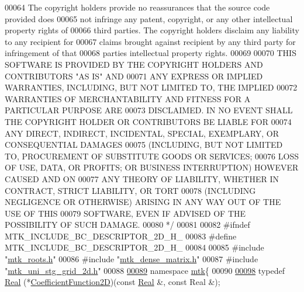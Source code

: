 \begin{DoxyCode}
00064 \textcolor{comment}{The copyright holders provide no reassurances that the source code provided does}
00065 \textcolor{comment}{not infringe any patent, copyright, or any other intellectual property rights of}
00066 \textcolor{comment}{third parties. The copyright holders disclaim any liability to any recipient for}
00067 \textcolor{comment}{claims brought against recipient by any third party for infringement of that}
00068 \textcolor{comment}{parties intellectual property rights.}
00069 \textcolor{comment}{}
00070 \textcolor{comment}{THIS SOFTWARE IS PROVIDED BY THE COPYRIGHT HOLDERS AND CONTRIBUTORS "AS IS" AND}
00071 \textcolor{comment}{ANY EXPRESS OR IMPLIED WARRANTIES, INCLUDING, BUT NOT LIMITED TO, THE IMPLIED}
00072 \textcolor{comment}{WARRANTIES OF MERCHANTABILITY AND FITNESS FOR A PARTICULAR PURPOSE ARE}
00073 \textcolor{comment}{DISCLAIMED. IN NO EVENT SHALL THE COPYRIGHT HOLDER OR CONTRIBUTORS BE LIABLE FOR}
00074 \textcolor{comment}{ANY DIRECT, INDIRECT, INCIDENTAL, SPECIAL, EXEMPLARY, OR CONSEQUENTIAL DAMAGES}
00075 \textcolor{comment}{(INCLUDING, BUT NOT LIMITED TO, PROCUREMENT OF SUBSTITUTE GOODS OR SERVICES;}
00076 \textcolor{comment}{LOSS OF USE, DATA, OR PROFITS; OR BUSINESS INTERRUPTION) HOWEVER CAUSED AND ON}
00077 \textcolor{comment}{ANY THEORY OF LIABILITY, WHETHER IN CONTRACT, STRICT LIABILITY, OR TORT}
00078 \textcolor{comment}{(INCLUDING NEGLIGENCE OR OTHERWISE) ARISING IN ANY WAY OUT OF THE USE OF THIS}
00079 \textcolor{comment}{SOFTWARE, EVEN IF ADVISED OF THE POSSIBILITY OF SUCH DAMAGE.}
00080 \textcolor{comment}{*/}
00081 
00082 \textcolor{preprocessor}{#ifndef MTK\_INCLUDE\_BC\_DESCRIPTOR\_2D\_H\_}
00083 \textcolor{preprocessor}{#define MTK\_INCLUDE\_BC\_DESCRIPTOR\_2D\_H\_}
00084 
00085 \textcolor{preprocessor}{#include "\hyperlink{mtk__roots_8h}{mtk\_roots.h}"}
00086 \textcolor{preprocessor}{#include "\hyperlink{mtk__dense__matrix_8h}{mtk\_dense\_matrix.h}"}
00087 \textcolor{preprocessor}{#include "\hyperlink{mtk__uni__stg__grid__2d_8h}{mtk\_uni\_stg\_grid\_2d.h}"}
00088 
\hypertarget{mtk__bc__descriptor__2d_8h_source_l00089}{}\hyperlink{namespacemtk}{00089} \textcolor{keyword}{namespace }\hyperlink{namespacemtk}{mtk}\{
00090 
\hypertarget{mtk__bc__descriptor__2d_8h_source_l00098}{}\hyperlink{group__c07-mim__ops_gad9e1c0ace886b0029aefffa5f320e852}{00098} \textcolor{keyword}{typedef} \hyperlink{group__c01-roots_gac080bbbf5cbb5502c9f00405f894857d}{Real} (*\hyperlink{group__c07-mim__ops_gad9e1c0ace886b0029aefffa5f320e852}{CoefficientFunction2D})(\textcolor{keyword}{const} \hyperlink{group__c01-roots_gac080bbbf5cbb5502c9f00405f894857d}{Real} &, \textcolor{keyword}{const} Real &);

\end{DoxyCode}
